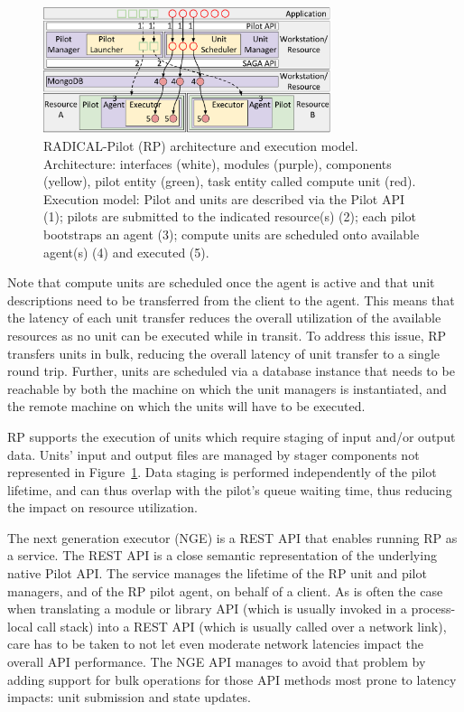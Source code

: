 \documentclass{webofc}
\begin{document}
\begin{figure}
  \centering
  \includegraphics[width=0.75\textwidth]{figures/rp_arch.pdf}
  \caption{RADICAL-Pilot (RP) architecture and execution model.
           Architecture: interfaces (white), modules (purple), components
           (yellow), pilot entity (green), task entity called compute unit
           (red). Execution model: Pilot and units are described via the
           Pilot API (1); pilots are submitted to the indicated resource(s)
           (2); each pilot bootstraps an agent (3); compute units are
           scheduled onto available agent(s) (4) and executed
           (5).}\label{fig:rp-arch}
\end{figure}
	
Note that compute units are scheduled once the agent is active and that unit
descriptions need to be transferred from the client to the agent. This means
that the latency of each unit transfer reduces the overall utilization of the
available resources as no unit can be executed while in transit. To address
this issue, RP transfers units in bulk, reducing the overall latency of unit
transfer to a single round trip. Further, units are scheduled via a database
instance that needs to be reachable by both the machine on which the unit
managers is instantiated, and the remote machine on which the units will have
to be executed.
	
RP supports the execution of units which require staging of input and/or
output data. Units’ input and output files are managed by stager components
not represented in Figure~\ref{fig:rp-arch}. Data staging is performed
independently of the pilot lifetime, and can thus overlap with the pilot's
queue waiting time, thus reducing the impact on resource utilization.
	
The next generation executor (NGE) is a REST API that enables running RP as a
service. The REST API is a close semantic representation of the underlying
native Pilot API.  The service manages the lifetime of the RP unit and pilot
managers, and of the RP pilot agent, on behalf of a client. As is often the
case when translating a module or library API (which is usually invoked in a
process-local call stack) into a REST API (which is usually called over a
network link), care has to be taken to not let even moderate network
latencies impact the overall API performance.  The NGE API manages to avoid
that problem by adding support for bulk operations for those API methods most
prone to latency impacts: unit submission and state updates.
	
\end{document}

